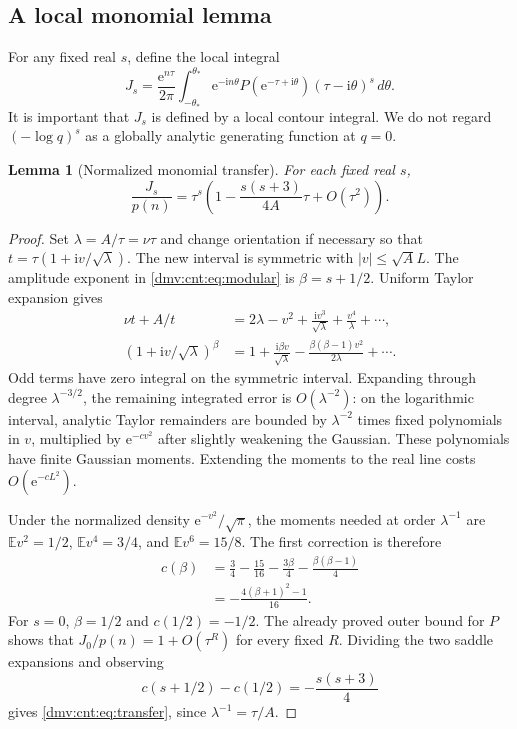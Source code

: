 \documentclass[11pt,letterpaper]{article}
\numberwithin{equation}{section}
\newtheorem{lemma}[theorem]{Lemma}
\theoremstyle{definition}\newtheorem{definition}[theorem]{Definition}
\theoremstyle{remark}\newtheorem{remark}[theorem]{Remark}
\newcommand{\E}{\mathbb E}
\newcommand{\ii}{\mathrm i}
\newcommand{\ee}{\mathrm e}
\begin{document}
\subsection{A local monomial lemma}
For any fixed real $s$, define the local integral
\begin{equation}\label{dmv:cnt:eq:Js}
J_s=\frac{\ee^{n\tau}}{2\pi}
\int_{-\theta_*}^{\theta_*}\ee^{-\ii n\theta}
P(\ee^{-\tau+\ii\theta})(\tau-\ii\theta)^s\,d\theta.
\end{equation}
It is important that $J_s$ is defined by a local contour integral. We do not regard $(-\log q)^s$ as a globally analytic generating function at $q=0$.

\begin{lemma}[Normalized monomial transfer]\label{dmv:cnt:lem:transfer}
For each fixed real $s$,
\begin{equation}\label{dmv:cnt:eq:transfer}
\frac{J_s}{p(n)}=\tau^s\left(1-\frac{s(s+3)}{4A}\tau+O(\tau^2)\right).
\end{equation}
\end{lemma}
\begin{proof}
Set $\lambda=A/\tau=\nu\tau$ and change orientation if necessary so that $t=\tau(1+\ii v/\sqrt\lambda)$. The new interval is symmetric with $|v|\le\sqrt A L$. The amplitude exponent in \eqref{dmv:cnt:eq:modular} is $\beta=s+1/2$. Uniform Taylor expansion gives
\begin{align}\label{dmv:cnt:eq:saddleexp}
\nu t+A/t&=2\lambda-v^2+\frac{\ii v^3}{\sqrt\lambda}
+\frac{v^4}{\lambda}+\cdots,\\
(1+\ii v/\sqrt\lambda)^\beta
&=1+\frac{\ii\beta v}{\sqrt\lambda}
-\frac{\beta(\beta-1)v^2}{2\lambda}+\cdots.\nonumber
\end{align}
Odd terms have zero integral on the symmetric interval. Expanding through degree $\lambda^{-3/2}$, the remaining integrated error is $O(\lambda^{-2})$: on the logarithmic interval, analytic Taylor remainders are bounded by $\lambda^{-2}$ times fixed polynomials in $v$, multiplied by $\ee^{-c v^2}$ after slightly weakening the Gaussian. These polynomials have finite Gaussian moments. Extending the moments to the real line costs $O(\ee^{-cL^2})$.

Under the normalized density $\ee^{-v^2}/\sqrt\pi$, the moments needed at order $\lambda^{-1}$ are $\E v^2=1/2$, $\E v^4=3/4$, and $\E v^6=15/8$. The first correction is therefore
\begin{align}\label{dmv:cnt:eq:c-beta}
c(\beta)&=\frac34-\frac{15}{16}-\frac{3\beta}{4}
-\frac{\beta(\beta-1)}4\\
&=-\frac{4(\beta+1)^2-1}{16}.\nonumber
\end{align}
For $s=0$, $\beta=1/2$ and $c(1/2)=-1/2$. The already proved outer bound for $P$ shows that $J_0/p(n)=1+O(\tau^R)$ for every fixed $R$. Dividing the two saddle expansions and observing
\[
c(s+1/2)-c(1/2)=-\frac{s(s+3)}4
\]
gives \eqref{dmv:cnt:eq:transfer}, since $\lambda^{-1}=\tau/A$.
\end{proof}
\end{document}
